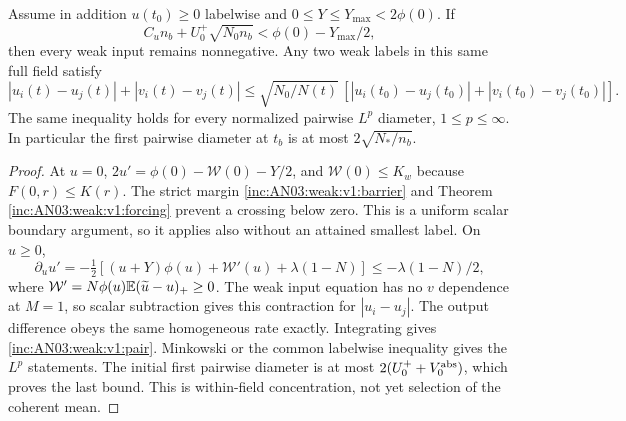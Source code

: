 \documentclass[11pt]{article}
\numberwithin{equation}{section}
\theoremstyle{remark}\newtheorem{remark}[theorem]{Remark}
\begin{document}
\begin{proposition}\label{inc:AN03:weak:v1:concentration}
Assume in addition $u(t_0)\ge0$ labelwise and $0\le Y\le Y_{\max}<2\phi(0)$. If
\begin{equation}\label{inc:AN03:weak:v1:barrier}
 C_un_b+U_0^+\sqrt{N_0n_b}<\phi(0)-Y_{\max}/2,
\end{equation}
then every weak input remains nonnegative. Any two weak labels in this same full field satisfy
\begin{equation}\label{inc:AN03:weak:v1:pair}
 |u_i(t)-u_j(t)|+|v_i(t)-v_j(t)|
 \le\sqrt{N_0/N(t)}\,[|u_i(t_0)-u_j(t_0)|+|v_i(t_0)-v_j(t_0)|].
\end{equation}
The same inequality holds for every normalized pairwise $L^p$ diameter, $1\le p\le\infty$. In particular the first pairwise diameter at $t_b$ is at most $2\sqrt{N_*/n_b}$.
\end{proposition}
\begin{proof}
At $u=0$, $2u'=\phi(0)-\mathcal W(0)-Y/2$, and $\mathcal W(0)\le K_w$ because $F(0,r)\le K(r)$. The strict margin \eqref{inc:AN03:weak:v1:barrier} and Theorem \ref{inc:AN03:weak:v1:forcing} prevent a crossing below zero. This is a uniform scalar boundary argument, so it applies also without an attained smallest label.
On $u\ge0$,
\[
 \partial_u u'=-\tfrac12[(u+Y)\phi(u)+\mathcal W'(u)+\lambda(1-N)]
 \le-\lambda(1-N)/2,
\]
where $\mathcal W'=N\phi(u)\mathbb E(\widetilde u-u)_+\ge0$. The weak input equation has no $v$ dependence at $M=1$, so scalar subtraction gives this contraction for $|u_i-u_j|$. The output difference obeys the same homogeneous rate exactly. Integrating gives \eqref{inc:AN03:weak:v1:pair}. Minkowski or the common labelwise inequality gives the $L^p$ statements. The initial first pairwise diameter is at most $2(U_0^++V_0^{\rm abs})$, which proves the last bound. This is within-field concentration, not yet selection of the coherent mean.
\end{proof}
\end{document}
